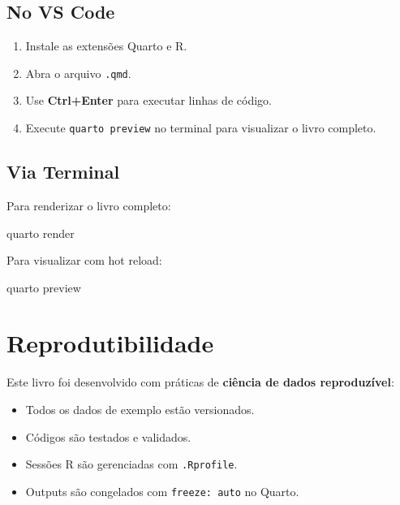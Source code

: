 \documentclass[
  letterpaper,
]{book}
\newenvironment{Shaded}{\begin{snugshade}}{\end{snugshade}}
\newcommand{\ExtensionTok}[1]{\textcolor[rgb]{0.00,0.23,0.31}{#1}}
\newcommand{\NormalTok}[1]{\textcolor[rgb]{0.00,0.23,0.31}{#1}}
\providecommand{\tightlist}{%
  \setlength{\itemsep}{0pt}\setlength{\parskip}{0pt}}\usepackage{longtable,booktabs,array}
\begin{document}
\subsection*{No VS Code}\label{no-vs-code}

\begin{enumerate}
\def\labelenumi{\arabic{enumi}.}
\tightlist
\item
  Instale as extensões Quarto e R.
\item
  Abra o arquivo \texttt{.qmd}.
\item
  Use \textbf{Ctrl+Enter} para executar linhas de código.
\item
  Execute \texttt{quarto\ preview} no terminal para visualizar o livro
  completo.
\end{enumerate}

\subsection*{Via Terminal}\label{via-terminal}

Para renderizar o livro completo:

\begin{Shaded}
\begin{Highlighting}[]
\ExtensionTok{quarto}\NormalTok{ render}
\end{Highlighting}
\end{Shaded}

Para visualizar com hot reload:

\begin{Shaded}
\begin{Highlighting}[]
\ExtensionTok{quarto}\NormalTok{ preview}
\end{Highlighting}
\end{Shaded}

\section*{Reprodutibilidade}\label{reprodutibilidade}


Este livro foi desenvolvido com práticas de \textbf{ciência de dados
reproduzível}:

\begin{itemize}
\tightlist
\item
  Todos os dados de exemplo estão versionados.
\item
  Códigos são testados e validados.
\item
  Sessões R são gerenciadas com \texttt{.Rprofile}.
\item
  Outputs são congelados com \texttt{freeze:\ auto} no Quarto.
\end{itemize}
\end{document}

